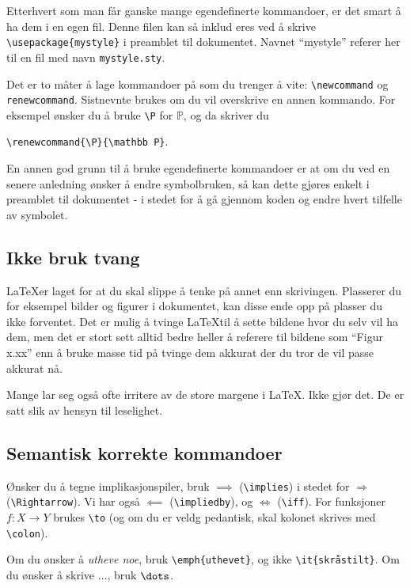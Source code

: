 \documentclass[a4paper, norsk]{article}  %
\renewcommand{\P}{\mathbb{P}}
\begin{document}
Etterhvert som man får ganske mange egendefinerte kommandoer, er det smart å ha dem i en egen fil. Denne filen kan så inklud	eres ved å skrive \verb|\usepackage{mystyle}| i preamblet til dokumentet. Navnet ``mystyle'' referer her til en fil med navn \verb|mystyle.sty|.

Det er to måter å lage kommandoer på som du trenger å vite: \verb|\newcommand| og \verb|renewcommand|. Sistnevnte brukes om du vil overskrive en annen kommando. For eksempel ønsker du å bruke \verb|\P| for $\P$, og da skriver du 
\begin{center}
\texttt{\textbackslash renewcommand\{\textbackslash P\}\{\textbackslash mathbb P\}}.
\end{center}

En annen god grunn til å bruke egendefinerte kommandoer er at om du ved en senere anledning ønsker å endre symbolbruken, så kan dette gjøres enkelt i preamblet til dokumentet - i stedet for å gå gjennom koden og endre hvert tilfelle av symbolet.

\subsection{Ikke bruk tvang}

\LaTeX er laget for at du skal slippe å tenke på annet enn skrivingen. Plasserer du for eksempel bilder og figurer i dokumentet, kan disse ende opp på plasser du ikke forventet. Det er mulig å tvinge \LaTeX til å sette bildene hvor du selv vil ha dem, men det er stort sett alltid bedre heller å referere til bildene som ``Figur x.xx'' enn å bruke masse tid på tvinge dem akkurat der du tror de vil passe akkurat nå.

Mange lar seg også ofte irritere av de store margene i \LaTeX. Ikke gjør det. De er satt slik av hensyn til leselighet.

\subsection{Semantisk korrekte kommandoer}

Ønsker du å tegne implikasjonspiler, bruk $\implies$ (\verb|\implies|) i stedet for $\Rightarrow$ (\verb|\Rightarrow|). Vi har også $\impliedby$ (\verb|\impliedby|), og $\iff$ (\verb|\iff|). For funksjoner $f\colon X \to Y$ brukes \verb|\to| (og om du er veldg pedantisk, skal kolonet skrives med \verb|\colon|).

Om du ønsker å \emph{utheve noe}, bruk \verb|\emph{uthevet}|, og ikke \verb|\it{skråstilt}|. Om du ønsker å skrive $\dots$, bruk $\verb|\dots|$. 
\end{document}
